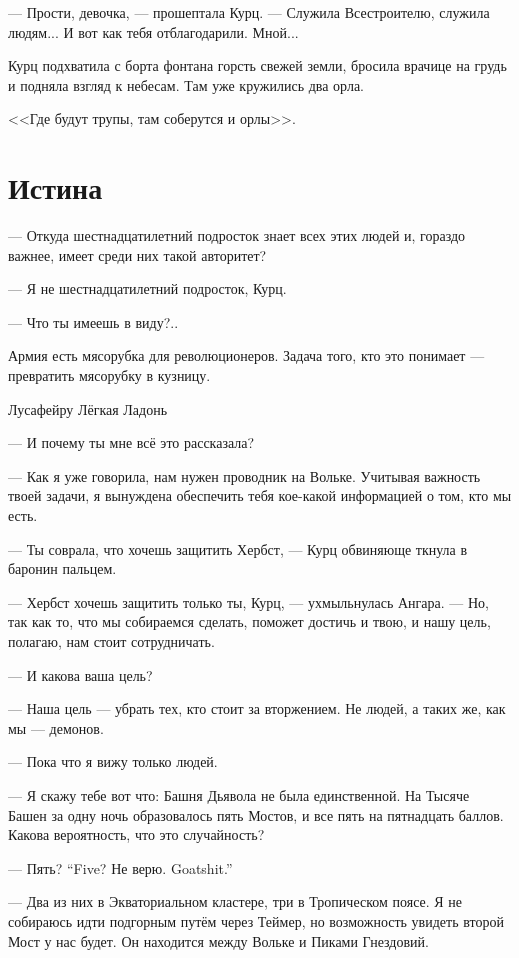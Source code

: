 --- Прости, девочка, --- прошептала Курц.
--- Служила Всестроителю, служила людям...
И вот как тебя отблагодарили.
Мной...

Курц подхватила с борта фонтана горсть свежей земли, бросила врачице на грудь и подняла взгляд к небесам.
Там уже кружились два орла.

<<Где будут трупы, там соберутся и орлы>>.

\section{Истина}

--- Откуда шестнадцатилетний подросток знает всех этих людей и, гораздо важнее, имеет среди них такой авторитет?

--- Я не шестнадцатилетний подросток, Курц.

--- Что ты имеешь в виду?..

\asterism

\epigraph{
Армия есть мясорубка для революционеров.
Задача того, кто это понимает --- превратить мясорубку в кузницу.}
{Лусафейру Лёгкая Ладонь}

--- И почему ты мне всё это рассказала?

--- Как я уже говорила, нам нужен проводник на Вольке.
Учитывая важность твоей задачи, я вынуждена обеспечить тебя кое-какой информацией о том, кто мы есть.

--- Ты соврала, что хочешь защитить Хербст, --- Курц обвиняюще ткнула в баронин пальцем.

--- Хербст хочешь защитить только ты, Курц, --- ухмыльнулась Ангара.
--- Но, так как то, что мы собираемся сделать, поможет достичь и твою, и нашу цель, полагаю, нам стоит сотрудничать.

--- И какова ваша цель?

--- Наша цель --- убрать тех, кто стоит за вторжением.
Не людей, а таких же, как мы --- демонов.

--- Пока что я вижу только людей.

--- Я скажу тебе вот что: Башня Дьявола не была единственной.
На Тысяче Башен за одну ночь образовалось пять Мостов, и все пять на пятнадцать баллов.
Какова вероятность, что это случайность?

{--- Пять?}
{``Five?}
{Не верю.}
{Goatshit.''}

--- Два из них в Экваториальном кластере, три в Тропическом поясе.
Я не собираюсь идти подгорным путём через Теймер, но возможность увидеть второй Мост у нас будет.
Он находится между Вольке и Пиками Гнездовий.

